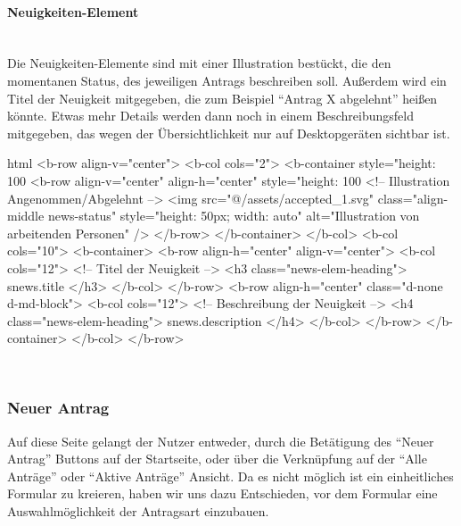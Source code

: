 \paragraph{Neuigkeiten-Element}
~\\
Die Neuigkeiten-Elemente sind mit einer Illustration bestückt, die den momentanen Status, des jeweiligen Antrags beschreiben soll. Außerdem wird ein Titel der Neuigkeit mitgegeben, die zum Beispiel \enquote{Antrag X abgelehnt} heißen könnte. Etwas mehr Details werden dann noch in einem Beschreibungsfeld mitgegeben, das wegen der Übersichtlichkeit nur auf Desktopgeräten sichtbar ist.
\begin{code}{html}
	<b-row align-v="center">
	<b-col cols="2">
	  <b-container style="height: 100%
		<b-row align-v="center" align-h="center" style="height: 100%
		  <!-- Illustration Angenommen/Abgelehnt -->
		  <img
			src="@/assets/accepted_1.svg"
			class="align-middle news-status"
			style="height: 50px; width: auto"
			alt="Illustration von arbeitenden Personen"
		  />
		</b-row>
	  </b-container>
	</b-col>
	<b-col cols="10">
	  <b-container>
		<b-row align-h="center" align-v="center">
		  <b-col cols="12">
			<!-- Titel der Neuigkeit -->
			<h3 class="news-elem-heading">{{ snews.title }}</h3>
		  </b-col>
		</b-row>
		<b-row align-h="center" class="d-none d-md-block">
		  <b-col cols="12">
			<!-- Beschreibung der Neuigkeit -->
			<h4 class="news-elem-heading">{{ snews.description }}</h4>
		  </b-col>
		</b-row>
	  </b-container>
	</b-col>
  </b-row>	
\end{code}
	\label{list:htmlnews} ~\\
\newpage
\subsubsection{Neuer Antrag}
Auf diese Seite gelangt der Nutzer entweder, durch die Betätigung des \enquote{Neuer Antrag} Buttons auf der Startseite, oder über die Verknüpfung auf der \enquote{Alle Anträge} oder \enquote{Aktive Anträge} Ansicht. Da es nicht möglich ist ein einheitliches Formular zu kreieren, haben wir uns dazu Entschieden, vor dem Formular eine Auswahlmöglichkeit der Antragsart einzubauen.
